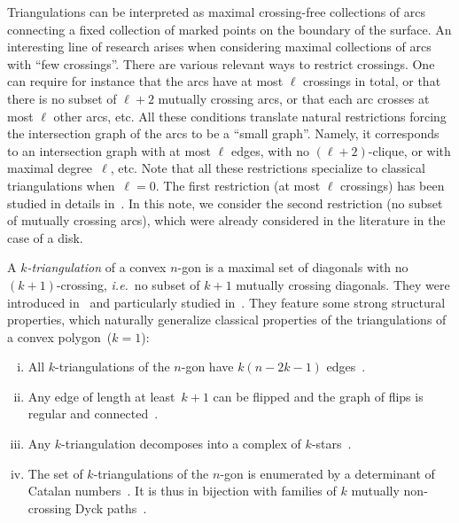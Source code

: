 \documentclass{amsart}
\theoremstyle{remark}
\newcommand{\darkblue}{\color{darkblue}} %
\newcommand{\defn}[1]{\textsl{\darkblue #1}} %
\newcommand{\ie}{\textit{i.e.}~} %
\begin{document}
Triangulations can be interpreted as maximal crossing-free collections of arcs connecting a fixed collection of marked points on the boundary of the surface.
An interesting line of research arises when considering maximal collections of arcs with ``few crossings''.
There are various relevant ways to restrict crossings.
One can require for instance that the arcs have at most $\ell$ crossings in total, or that there is no subset of $\ell+2$ mutually crossing arcs, or that each arc crosses at most $\ell$ other arcs, etc.
All these conditions translate natural restrictions forcing the intersection graph of the arcs to be a ``small graph''.
Namely, it corresponds to an intersection graph with at most $\ell$ edges, with no $(\ell+2)$-clique, or with maximal degree~$\ell$, etc.
Note that all these restrictions specialize to classical triangulations when~$\ell = 0$.
The first restriction (at most $\ell$ crossings) has been studied in details in~\cite{PilaudRue}.
In this note, we consider the second restriction (no subset of mutually crossing arcs), which were already considered in the literature in the case of a disk.

A \defn{$k$-triangulation} of a convex $n$-gon is a maximal set of diagonals with no $(k+1)$-crossing, \ie no subset of $k+1$ mutually crossing diagonals.
They were introduced in~\cite{CapoyleasPach} and particularly studied in~\cite{Nakamigawa, DressKoolenMoulton, Jonsson1, Jonsson2, SerranoStump, PilaudSantos-multitriangulations}.
They feature some strong structural properties, which naturally generalize classical properties of the triangulations of a convex polygon~($k=1$):
\begin{enumerate}[(i)]
\item All $k$-triangulations of the $n$-gon have $k(n-2k-1)$ edges~\cite{CapoyleasPach, Nakamigawa, DressKoolenMoulton}.
\item Any edge of length at least~$k + 1$ can be flipped and the graph of flips is regular and connected~\cite{Nakamigawa, DressKoolenMoulton}.
\item Any $k$-triangulation decomposes into a complex of $k$-stars~\cite{PilaudSantos-multitriangulations}.
\item The set of $k$-triangulations of the $n$-gon is enumerated by a determinant of Catalan numbers~\cite{Jonsson1, Jonsson2}. It is thus in bijection with families of $k$ mutually non-crossing Dyck paths~\cite{SerranoStump}.
\end{enumerate}
\end{document}
